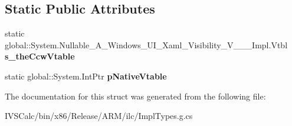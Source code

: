 \subsection*{Static Public Attributes}
\begin{DoxyCompactItemize}
\item 
\mbox{\label{struct_system_1_1_nullable___a___windows___u_i___xaml___visibility___v_______impl_1_1_vtbl_a4e17c416b973f8e9bc2d831c4807753e}} 
static global\+::\+System.\+Nullable\+\_\+\+A\+\_\+\+Windows\+\_\+\+U\+I\+\_\+\+Xaml\+\_\+\+Visibility\+\_\+\+V\+\_\+\+\_\+\+\_\+\+Impl.\+Vtbl {\bfseries s\+\_\+the\+Ccw\+Vtable}
\item 
\mbox{\label{struct_system_1_1_nullable___a___windows___u_i___xaml___visibility___v_______impl_1_1_vtbl_a167c5c065a3ff8f94422bcff7fe4bc47}} 
static global\+::\+System.\+Int\+Ptr {\bfseries p\+Native\+Vtable}
\end{DoxyCompactItemize}


The documentation for this struct was generated from the following file\+:\begin{DoxyCompactItemize}
\item 
I\+V\+S\+Calc/bin/x86/\+Release/\+A\+R\+M/ilc/Impl\+Types.\+g.\+cs\end{DoxyCompactItemize}
